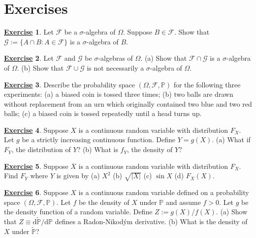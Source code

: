 \documentclass[12pt]{book}
\numberwithin{equation}{chapter}
\theoremstyle{plain}
\numberwithin{theorem}{section}
\theoremstyle{definition}
\newtheorem{exercise}{\underline{Exercise}}
\numberwithin{exercise}{chapter}
\newcommand{\<}{\langle}
\renewcommand{\>}{\rangle}
\renewcommand{\(}{\left(}
\renewcommand{\)}{\right)}
\renewcommand{\[}{\left[}
\renewcommand{\]}{\right]}
\newcommand\Pb{\mathds{P}}
\newcommand\Fc{\mathscr{F}}
\newcommand\Gc{\mathscr{G}}
\newcommand\Om{\Omega}
\newcommand\sig{\sigma}
\newcommand\Pbt{\widetilde{\Pb}}
\newcommand\dd{\mathrm{d}}
\begin{document}
\section{Exercises}
\label{sec:exercises-1}

\begin{exercise}
\label{exer:1.1}
Let $\Fc$ be a $\sig$-algebra of $\Om$.  Suppose $B \in \Fc$.  Show that $\Gc := \{ A \cap B : A \in \Fc \}$ is a $\sig$-algebra of $B$.
\end{exercise}

\begin{exercise}
\label{exer:1.2}
Let $\Fc$ and $\Gc$ be $\sig$-algebras of $\Om$.  
(a) Show that $\Fc \cap \Gc$ is a $\sig$-algebra of $\Om$.
(b) Show that $\Fc \cup \Gc$ is not necessarily a $\sig$-algebra of $\Om$.
\end{exercise}

\begin{exercise}
\label{exer:1.3}
Describe the probability space $(\Om,\Fc,\Pb)$ for the following three experiments:
(a) a biased coin is tossed three times;
(b) two balls are drawn without replacement from an urn which originally contained two blue and two red balls;
(c) a biased coin is tossed repeatedly until a head turns up.
\end{exercise}

\begin{exercise}
\label{exer:1.4}
Suppose $X$ is a continuous random variable with distribution $F_X$.  Let $g$ be a strictly increasing continuous function.  Define $Y = g(X)$. (a) What if $F_Y$, the distribution of $Y$? (b) What is $f_Y$, the density of $Y$?
\end{exercise}

\begin{exercise}
\label{exer:1.5}
Suppose $X$ is a continuous random variable with distribution $F_X$.  Find $F_Y$ where $Y$ is given by
(a) $X^2$
(b) $\sqrt{|X|}$
(c) $\sin X$
(d) $F_X(X)$.
\end{exercise}

\begin{exercise}
\label{exer:1.6}
Suppose $X$ is a continuous random variable defined on a probability space $(\Om,\Fc,\Pb)$.  Let $f$ be the density of $X$ under $\Pb$ and assume $f>0$.  Let $g$ be the density function of a random variable.  Define $Z := g(X)/f(X)$.  (a) Show that $Z \equiv \dd \Pbt/\dd \Pb$ defines a Radon-Nikod\'ym derivative.  (b) What is the density of $X$ under $\Pbt$?
\end{exercise}
\end{document}

